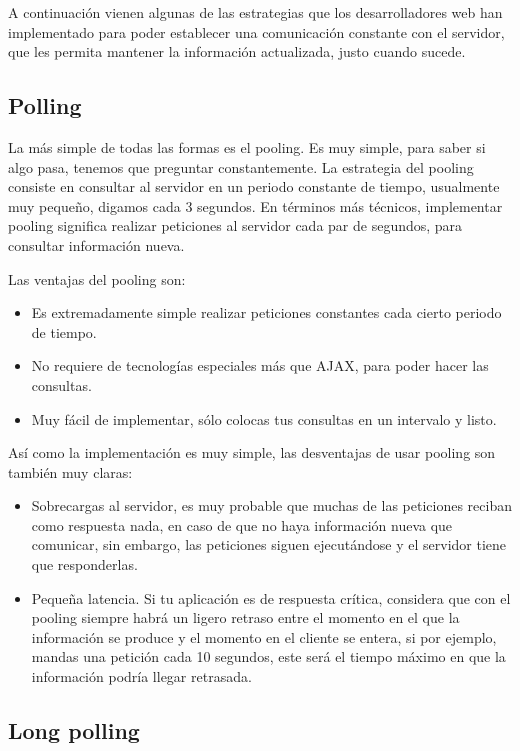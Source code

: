 A continuación vienen algunas de las estrategias que los desarrolladores web han implementado para poder establecer una comunicación constante con el servidor, que les permita mantener la información actualizada, justo cuando sucede.

\subsection{Polling}

La más simple de todas las formas es el pooling. Es muy simple, para saber si algo pasa, tenemos que preguntar constantemente. La estrategia del pooling consiste en consultar al servidor en un periodo constante de tiempo, usualmente muy pequeño, digamos cada 3 segundos. En términos más técnicos, implementar pooling significa realizar peticiones al servidor cada par de segundos, para consultar información nueva.

Las ventajas del pooling son:

\begin{itemize}
  \item Es extremadamente simple realizar peticiones constantes cada cierto periodo de tiempo.
  \item No requiere de tecnologías especiales más que AJAX, para poder hacer las consultas.
  \item Muy fácil de implementar, sólo colocas tus consultas en un intervalo y listo.
\end{itemize}

Así como la implementación es muy simple, las desventajas de usar pooling son también muy claras:

\begin{itemize}
  \item Sobrecargas al servidor, es muy probable que muchas de las peticiones reciban como respuesta nada, en caso de que no haya información nueva que comunicar, sin embargo, las peticiones siguen ejecutándose y el servidor tiene que responderlas.
  \item Pequeña latencia. Si tu aplicación es de respuesta crítica, considera que con el pooling siempre habrá un ligero retraso entre el momento en el que la información se produce y el momento en el cliente se entera, si por ejemplo, mandas una petición cada 10 segundos, este será el tiempo máximo en que la información podría llegar retrasada.
\end{itemize}

\subsection{Long polling}

